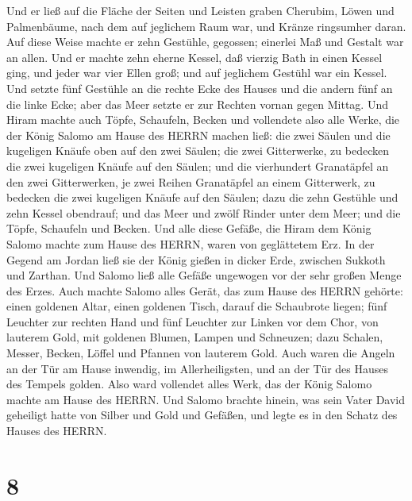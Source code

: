  Und er ließ auf die Fläche der Seiten und Leisten graben
Cherubim, Löwen und Palmenbäume, nach dem auf jeglichem Raum war, und
Kränze ringsumher daran.  Auf diese Weise machte er zehn
Gestühle, gegossen; einerlei Maß und Gestalt war an allen. 
Und er machte zehn eherne Kessel, daß vierzig Bath in einen Kessel ging,
und jeder war vier Ellen groß; und auf jeglichem Gestühl war ein Kessel.
 Und setzte fünf Gestühle an die rechte Ecke des Hauses und
die andern fünf an die linke Ecke; aber das Meer setzte er zur Rechten
vornan gegen Mittag.  Und Hiram machte auch Töpfe,
Schaufeln, Becken und vollendete also alle Werke, die der König Salomo
am Hause des HERRN machen ließ:  die zwei Säulen und die
kugeligen Knäufe oben auf den zwei Säulen; die zwei Gitterwerke, zu
bedecken die zwei kugeligen Knäufe auf den Säulen;  und die
vierhundert Granatäpfel an den zwei Gitterwerken, je zwei Reihen
Granatäpfel an einem Gitterwerk, zu bedecken die zwei kugeligen Knäufe
auf den Säulen;  dazu die zehn Gestühle und zehn Kessel
obendrauf;  und das Meer und zwölf Rinder unter dem Meer;
 und die Töpfe, Schaufeln und Becken. Und alle diese
Gefäße, die Hiram dem König Salomo machte zum Hause des HERRN, waren von
geglättetem Erz.  In der Gegend am Jordan ließ sie der
König gießen in dicker Erde, zwischen Sukkoth und Zarthan. 
Und Salomo ließ alle Gefäße ungewogen vor der sehr großen Menge des
Erzes.  Auch machte Salomo alles Gerät, das zum Hause des
HERRN gehörte: einen goldenen Altar, einen goldenen Tisch, darauf die
Schaubrote liegen;  fünf Leuchter zur rechten Hand und fünf
Leuchter zur Linken vor dem Chor, von lauterem Gold, mit goldenen
Blumen, Lampen und Schneuzen;  dazu Schalen, Messer,
Becken, Löffel und Pfannen von lauterem Gold. Auch waren die Angeln an
der Tür am Hause inwendig, im Allerheiligsten, und an der Tür des Hauses
des Tempels golden.  Also ward vollendet alles Werk, das
der König Salomo machte am Hause des HERRN. Und Salomo brachte hinein,
was sein Vater David geheiligt hatte von Silber und Gold und Gefäßen,
und legte es in den Schatz des Hauses des HERRN.

\hypertarget{section-7}{%
\section{8}\label{section-7}}

